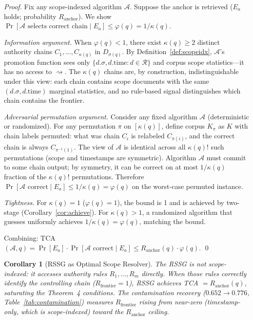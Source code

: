 \documentclass[11pt]{article}
\newtheorem{corollary}{Corollary}
\begin{document}
\begin{proof}
Fix any scope-indexed algorithm $\mathcal{A}$. Suppose the anchor is retrieved ($E_a$ holds; probability $R_{\mathrm{anchor}}$). We show $\Pr[\mathcal{A}\text{ selects correct chain} \mid E_a] \leq \varphi(q) = 1/\kappa(q)$.

\emph{Information argument.} When $\varphi(q) < 1$, there exist $\kappa(q) \geq 2$ distinct authority chains $C_1,\ldots,C_{\kappa(q)}$ in $D_{\sigma(q)}$. By Definition~\ref{def:scopeidx}, $\mathcal{A}$'s promotion function sees only $\{d.\sigma, d.\text{time} : d \in \mathcal{R}\}$ and corpus scope statistics---it has no access to $\rightsquigarrow$. The $\kappa(q)$ chains are, by construction, indistinguishable under this view: each chain contains scope documents with the same $(d.\sigma, d.\text{time})$ marginal statistics, and no rule-based signal distinguishes which chain contains the frontier.

\emph{Adversarial permutation argument.} Consider any fixed algorithm $\mathcal{A}$ (deterministic or randomized). For any permutation $\pi$ on $[\kappa(q)]$, define corpus $K_\pi$ as $K$ with chain labels permuted: what was chain $C_i$ is relabeled $C_{\pi(i)}$, and the correct chain is always $C_{\pi^{-1}(1)}$. The view of $\mathcal{A}$ is identical across all $\kappa(q)!$ such permutations (scope and timestamps are symmetric). Algorithm $\mathcal{A}$ must commit to some chain output; by symmetry, it can be correct on at most $1/\kappa(q)$ fraction of the $\kappa(q)!$ permutations. Therefore $\Pr[\mathcal{A}\text{ correct} \mid E_a] \leq 1/\kappa(q) = \varphi(q)$ on the worst-case permuted instance.

\emph{Tightness.} For $\kappa(q) = 1$ ($\varphi(q)=1$), the bound is 1 and is achieved by two-stage (Corollary~\ref{cor:achieve}). For $\kappa(q)>1$, a randomized algorithm that guesses uniformly achieves $1/\kappa(q) = \varphi(q)$, matching the bound.

Combining: TCA$(\mathcal{A},q) = \Pr[E_a]\cdot\Pr[\mathcal{A}\text{ correct}\mid E_a] \leq R_{\mathrm{anchor}}(q)\cdot\varphi(q)$. \qed
\end{proof}

\begin{corollary}[RSSG as Optimal Scope Resolver]
\label{cor:rssg_optimal}
The RSSG is \emph{not} scope-indexed: it accesses authority rules $R_1,\ldots,R_m$ directly. When those rules correctly identify the controlling chain ($R_{\mathrm{frontier}} = 1$), RSSG achieves TCA $= R_{\mathrm{anchor}}(q)$, saturating the Theorem~4 conditions. The contamination recovery ($0.652 \to 0.776$, Table~\ref{tab:contamination}) measures $R_{\mathrm{frontier}}$ rising from near-zero (timestamp-only, which is scope-indexed) toward the $R_{\mathrm{anchor}}$ ceiling.
\end{corollary}
\end{document}
